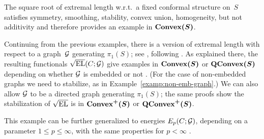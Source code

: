 \begin{example}
  \label{examp:el}
  The square root of extremal length w.r.t.\ a fixed conformal
  structure on~$S$ satisfies symmetry, smoothing, stability, convex
  union, homogeneity, but not additivity
  \cite[Section~4.8]{MGT21:Smoothings} and therefore provides an example in
  $\bm{\mathrm{Convex}(S)}$.
\end{example}

\begin{example}
  \label{examp:el-graph}
  Continuing from the previous examples, there is a version of
  extremal length with respect to a graph~$\mathcal{G}$ generating $\pi_1(S)$;
  see \cite[Section~4.9]{MGT21:Smoothings}, following
  \cite{Thurston19:Elastic}. As explained there, the
  resulting functionals $\sqrt{\operatorname{EL}}(C; \mathcal{G})$ give examples in
  $\bm{\mathrm{Convex}(S)}$ or
  $\bm{\mathrm{QConvex}(S)}$
  depending on whether $\mathcal{G}$ is embedded or not \cite[Propositions 4.22
  and~4.23]{MGT21:Smoothings}. (For the case of non-embedded graphs we
  need to stabilize, as in
  Example~\ref{examp:non-emb-graph}.) We can also allow $\mathcal{G}$ to be a
  directed graph generating $\pi_1(S)$; the same proofs show the stabilization of $\sqrt{\operatorname{EL}}$ is in $\bm{\mathrm{Convex}^+(S)}$ or $\bm{\mathrm{QConvex}^+(S)}$.

  This example can be further generalized to energies $E_p(C; \mathcal{G})$, depending on a parameter $1 \le p \le \infty$, with the same properties for $p < \infty$ \cite[Proposition~4.26]{MGT21:Smoothings}.
\end{example}

